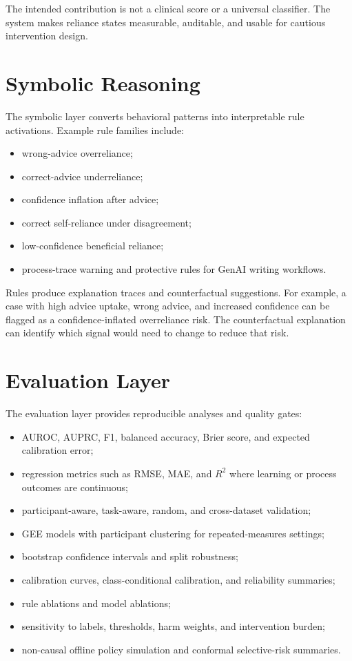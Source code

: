 \documentclass[11pt]{article}
\begin{document}
The intended contribution is not a clinical score or a universal classifier. The system makes reliance states measurable, auditable, and usable for cautious intervention design.

\section*{Symbolic Reasoning}

The symbolic layer converts behavioral patterns into interpretable rule activations. Example rule families include:

\begin{itemize}[leftmargin=*]
  \item wrong-advice overreliance;
  \item correct-advice underreliance;
  \item confidence inflation after advice;
  \item correct self-reliance under disagreement;
  \item low-confidence beneficial reliance;
  \item process-trace warning and protective rules for GenAI writing workflows.
\end{itemize}

Rules produce explanation traces and counterfactual suggestions. For example, a case with high advice uptake, wrong advice, and increased confidence can be flagged as a confidence-inflated overreliance risk. The counterfactual explanation can identify which signal would need to change to reduce that risk.

\section*{Evaluation Layer}

The evaluation layer provides reproducible analyses and quality gates:

\begin{itemize}[leftmargin=*]
  \item AUROC, AUPRC, F1, balanced accuracy, Brier score, and expected calibration error;
  \item regression metrics such as RMSE, MAE, and $R^2$ where learning or process outcomes are continuous;
  \item participant-aware, task-aware, random, and cross-dataset validation;
  \item GEE models with participant clustering for repeated-measures settings;
  \item bootstrap confidence intervals and split robustness;
  \item calibration curves, class-conditional calibration, and reliability summaries;
  \item rule ablations and model ablations;
  \item sensitivity to labels, thresholds, harm weights, and intervention burden;
  \item non-causal offline policy simulation and conformal selective-risk summaries.
\end{itemize}
\end{document}
